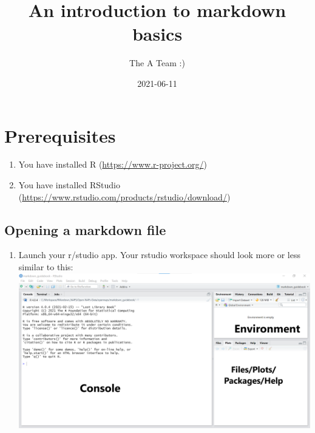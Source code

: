\documentclass[
]{book}
\title{An introduction to markdown basics}
\author{The A Team :)}
\date{2021-06-11}
\providecommand{\tightlist}{%
  \setlength{\itemsep}{0pt}\setlength{\parskip}{0pt}}
\begin{document}
\maketitle

{
\setcounter{tocdepth}{1}
\tableofcontents
}
\hypertarget{prerequisites}{%
\chapter{Prerequisites}\label{prerequisites}}

\begin{enumerate}
\def\labelenumi{\arabic{enumi}.}
\tightlist
\item
  You have installed R (\url{https://www.r-project.org/})
\item
  You have installed RStudio (\url{https://www.rstudio.com/products/rstudio/download/})
\end{enumerate}

\hypertarget{opening-a-markdown-file}{%
\section{Opening a markdown file}\label{opening-a-markdown-file}}

\begin{enumerate}
\def\labelenumi{\arabic{enumi}.}
\tightlist
\item
  Launch your r/studio app.
  Your rstudio workspace should look more or less similar to this: \includegraphics{tutorial_screenshots/rstudio_panels.png}
\end{enumerate}
\end{document}
